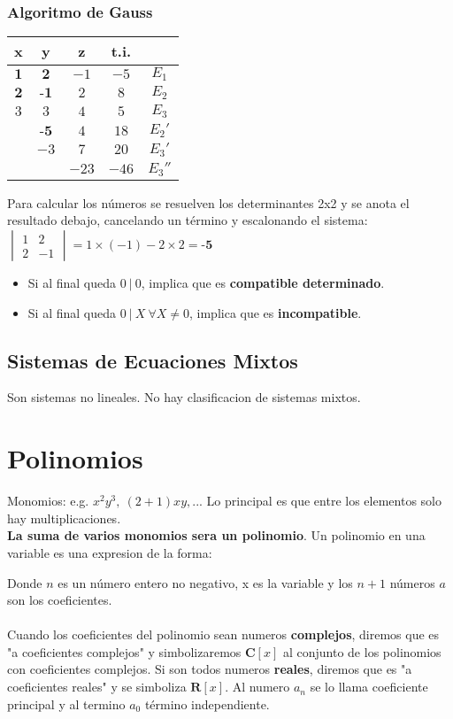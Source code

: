 \documentclass[10pt]{article}
\begin{document}
\subsubsection{Algoritmo de Gauss}
\begin{table}[h]
\begin{multicols}{2}
\begin{tabular}{ccc|cc}
x&y&z& t.i.&\\
\hline
$\textbf{1}$&$\textbf{2}$&$-1$&$-5$&$E_1$\\
$\textbf{2}$&$\textbf{-1}$&$2$&$8$&$E_2$\\
$3$&$3$&$4$&$5$&$E_3$\\
\hline
&$\textbf{-5}$&$4$&$18$&$E_2'$\\
&$-3$&$7$&$20$&$E_3'$\\
\hline
&&$-23$&$-46$&$E_3''$\\
\end{tabular}

Para calcular los números se resuelven los determinantes 2x2 y se anota el resultado debajo, cancelando un término y escalonando el sistema:\\
$\begin{vmatrix}
1&2\\
2&-1
\end{vmatrix} = 1 \times (-1) - 2 \times 2 = \textbf{-5}$
\end{multicols}
\end{table}
\begin{itemize}
\item Si al final queda $0\ |\ 0$, implica que es \textbf{compatible determinado}.
\item Si al final queda $0\ |\ X\ \forall X \not = 0$, implica que es \textbf{incompatible}.
\end{itemize}
\subsection{Sistemas de Ecuaciones Mixtos}
Son sistemas no lineales. No hay clasificacion de sistemas mixtos.

\newpage
\section{Polinomios}
Monomios: e.g. $x^2y^3,\ (2+1)xy,...$ Lo principal es que entre los elementos solo hay multiplicaciones.\\
\textbf{La suma de varios monomios sera un polinomio}. Un polinomio en una variable es una expresion de la forma:\
\begin{center}
\end{center}
Donde $n$ es un número entero no negativo, x es la variable y los $n+1$ números $a$ son los coeficientes.\\ \\ Cuando los coeficientes del polinomio sean numeros \textbf{complejos}, diremos que es "a coeficientes complejos" y simbolizaremos $\textbf{C}[x]$ al conjunto de los polinomios con coeficientes complejos. Si son todos numeros \textbf{reales}, diremos que es "a coeficientes reales" y se simboliza $\textbf{R}[x]$. Al numero $a_n$ se lo llama coeficiente principal y al termino $a_0$ término independiente.
\end{document}
